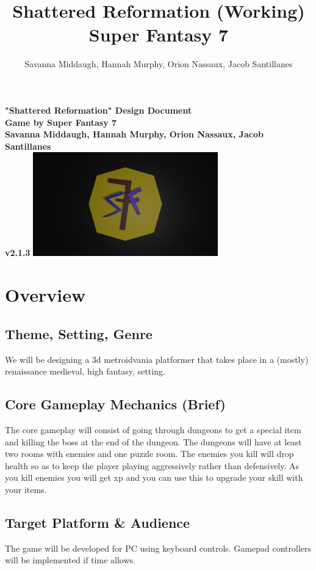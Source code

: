 \documentclass[titlepage]{article}
\title{Shattered Reformation (Working)\\Super Fantasy 7}
\author{Savanna Middaugh, Hannah Murphy, Orion Nassaux, Jacob Santillanes}
\begin{document}
\begin{titlepage}
    \centering
    \vfill
    {\bfseries\Large
        "Shattered Reformation" Design Document\\
        Game by Super Fantasy 7\\
        \vskip2cm
        Savanna Middaugh, Hannah Murphy, Orion Nassaux, Jacob Santillanes\\
	v2.1.3
    }    
    \vfill
    \includegraphics[width=8cm]{./images/logo.png}
    \vfill
    \vfill
\end{titlepage}

\section{Overview}

\subsection*{Theme, Setting, Genre}
We will be designing a 3d metroidvania platformer that takes place in a (mostly)
 renaissance medieval, high fantasy, setting. 

\subsection*{Core Gameplay Mechanics (Brief)}
The core gameplay will consist of going through dungeons to get a special item 
and killing the boss at the end of the dungeon. The dungeons will have at least 
two rooms with enemies and one puzzle room. The enemies you kill will drop 
health so as to keep the player playing aggressively rather than defensively. As
 you kill enemies you will get xp and you can use this to upgrade your skill 
 with your items. 

\subsection*{Target Platform \& Audience}
The game will be developed for PC using keyboard controls. Gamepad controllers 
will be implemented if time allows. \\
\end{document}
